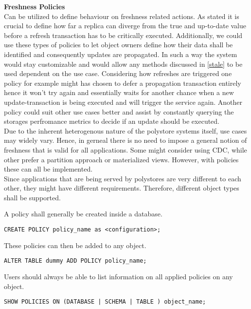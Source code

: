 \textbf{Freshness Policies}\\
Can be utilized to define behaviour on freshness related actions. As \cite{fekete:2018} stated it is crucial to define how far a replica can diverge from the true
and up-to-date value before a refresh transaction has to be critically executed.
Additionally, we could use these types of policies to let object owners define how their data shall be identified and consequently updates are propagated.
In such a way the system would stay customizable and would allow any methods discussed in \ref{stale} to be used dependent on the use case.
Considering how refreshes are triggered one policy for example might has chosen to defer a propagation transaction entirely hence it won't try again and
essentially waits for another chance when a new update-transaction is being executed and will trigger the service again. Another policy could suit other use cases better 
and assist by constantly querying the storages perfromance metrics to decide if an update should be executed.\\

Due to the inherent heterogenous nature of the polystore systems itself, use cases may widely vary. Hence, in gerneal there is no need to impose a 
general notion of freshness that is valid for all applications. Some might consider using CDC, while other prefer a partition approach or materialized views.
However, with policies these can all be implemented.\\



Since applications that are being served by polystores are very different to each other, they might have different requirements. 
Therefore, different object types shall be supported.

A policy shall generally be created inside a database.
\begin{verbatim}
CREATE POLICY policy_name as <configuration>;
\end{verbatim}

These policies can then be added to any object.
\begin{verbatim}
ALTER TABLE dummy ADD POLICY policy_name;
\end{verbatim}

Users should always be able to list information on all applied policies on any object.
\begin{verbatim}
SHOW POLICIES ON (DATABASE | SCHEMA | TABLE ) object_name;
\end{verbatim}


